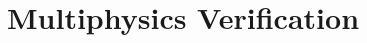 \documentclass[12pt]{report}
\newcommand{\REFDIR}{Reference_Cone_Calorimeter} %
\newcommand{\RETCCCONVTHREED}{3D_Lateral_convection}  %
\newcommand{\DIMDIR}{Extention_Cone_Calo_2D_3D}  %
\begin{document}
\fi
\graphicspath{
  {\REFDIR/}     
  {\DIMDIR/} 
  {\RETCCCONVTHREED/} 
}



\chapter{Multiphysics Verification}


\newpage


\newpage


\newpage



\ifdefined\Multiphysics
\clearpage
{}


\end{document}
